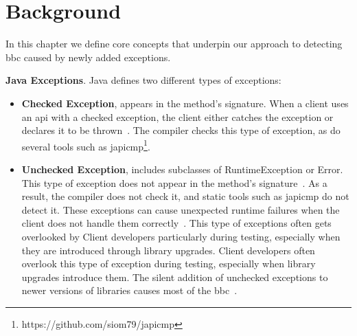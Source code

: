 \chapter{Background}

In this chapter we define core concepts that underpin our approach to detecting \gls{bbc} caused by newly added exceptions.

\textbf{Java Exceptions}. Java defines two different types of exceptions: 
\begin{itemize}
    \item \textbf{Checked Exception}, appears in the method's signature. When a client uses an \gls{api} with a checked exception, the client either catches the exception or declares it to be thrown~\cite{Sousa2020evolution}. The compiler checks this type of exception, as do several tools such as japicmp\footnote{https://github.com/siom79/japicmp}.
    \item \textbf{Unchecked Exception}, includes subclasses of RuntimeException or Error. This type of exception does not appear in the method's signature~\cite{Asaduzzaman2017}. As a result, the compiler does not check it, and static tools such as japicmp do not detect it. These exceptions can cause unexpected runtime failures when the client does not handle them correctly~\cite{Padua2017}. This type of exceptions often gets overlooked by Client developers particularly during testing, especially when they are introduced through library upgrades. Client developers often overlook this type of exception during testing, especially when library upgrades introduce them. The silent addition of unchecked exceptions to newer versions of libraries causes most of the \gls{bbc}~\cite{Cossette2012}.
\end{itemize}

